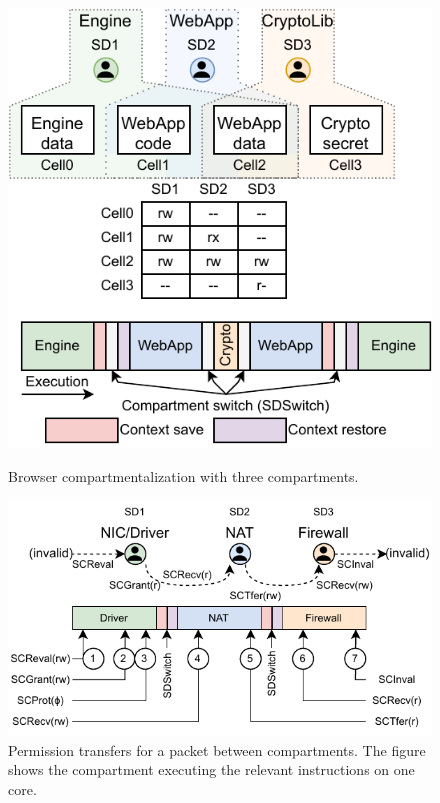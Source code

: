 \begin{figure}
  \centering
  \includegraphics[width=0.65\linewidth]{media/seccells/browser_webapp.pdf}
  \caption{Browser compartmentalization with three compartments.}
  \label{fig:seccells:browser_eg}
  \includegraphics[width=0.9\linewidth]{media/seccells/dataflow_app.pdf}
  \caption[Permission transfers for a packet between \seccells compartments.]
          {Permission transfers for a packet between \seccells compartments. 
            The figure shows the compartment executing the relevant \seccells 
            instructions on one core.}
  \label{fig:seccells:dataflow_app}
\end{figure}

